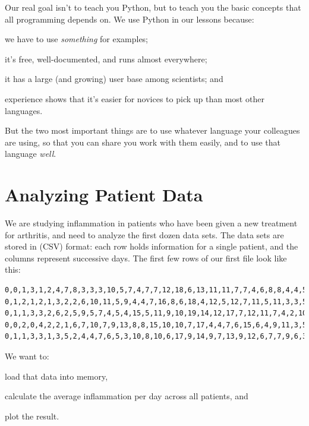 \documentclass{book}
\begin{document}
Our real goal isn't to teach you Python, but to teach you the basic
concepts that all programming depends on. We use Python in our lessons
because:

\begin{swcenumerate}
\item
  we have to use \emph{something} for examples;
\item
  it's free, well-documented, and runs almost everywhere;
\item
  it has a large (and growing) user base among scientists; and
\item
  experience shows that it's easier for novices to pick up than most
  other languages.
\end{swcenumerate}

But the two most important things are to use whatever language your
colleagues are using, so that you can share you work with them easily,
and to use that language \emph{well}.

\section{Analyzing Patient Data}

We are studying inflammation in patients who have been given a new
treatment for arthritis, and need to analyze the first dozen data sets.
The data sets are stored in 
(CSV) format: each row holds information for a single patient, and the
columns represent successive days. The first few rows of our first file
look like this:

\begin{verbatim}
0,0,1,3,1,2,4,7,8,3,3,3,10,5,7,4,7,7,12,18,6,13,11,11,7,7,4,6,8,8,4,4,5,7,3,4,2,3,0,0
0,1,2,1,2,1,3,2,2,6,10,11,5,9,4,4,7,16,8,6,18,4,12,5,12,7,11,5,11,3,3,5,4,4,5,5,1,1,0,1
0,1,1,3,3,2,6,2,5,9,5,7,4,5,4,15,5,11,9,10,19,14,12,17,7,12,11,7,4,2,10,5,4,2,2,3,2,2,1,1
0,0,2,0,4,2,2,1,6,7,10,7,9,13,8,8,15,10,10,7,17,4,4,7,6,15,6,4,9,11,3,5,6,3,3,4,2,3,2,1
0,1,1,3,3,1,3,5,2,4,4,7,6,5,3,10,8,10,6,17,9,14,9,7,13,9,12,6,7,7,9,6,3,2,2,4,2,0,1,1
\end{verbatim}

We want to:

\begin{swcitemize}
\item
  load that data into memory,
\item
  calculate the average inflammation per day across all patients, and
\item
  plot the result.
\end{swcitemize}
\end{document}
